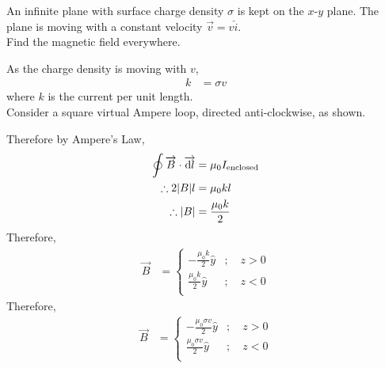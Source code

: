 \documentclass[fleqn, a4paper, 12pt, twoside]{article}
\theoremstyle{definition}
\theoremstyle{theorem}
\begin{document}
\begin{question}
	An infinite plane with surface charge density $\sigma$ is kept on the $x$-$y$ plane.
	The plane is moving with a constant velocity $\overrightarrow{v} = v \hat{i}$.\\
	Find the magnetic field everywhere.
\end{question}

\begin{solution} 
	As the charge density is moving with $v$,
	\begin{align*}
		k & = \sigma v
	\end{align*}
	where $k$ is the current per unit length.\\
	Consider a square virtual Ampere loop, directed anti-clockwise, as shown.
	\begin{figure}[H]
	\end{figure}
	Therefore by Ampere's Law,
	\begin{align*}
		\oint \overrightarrow{B} \cdot \overrightarrow{\dif l} & = \mu_0 I_{\textnormal{enclosed}} \\
		\therefore 2 |B| l                                     & = \mu_0 k l                       \\
		\therefore |B|                                         & = \frac{\mu_0 k}{2}
	\end{align*}
	Therefore,
	\begin{align*}
		\overrightarrow{B} &=
			\begin{cases}
				-\frac{\mu_0 k}{2} \hat{y} & ;\quad z > 0 \\
				\frac{\mu_0 k}{2} \hat{y}  & ;\quad z < 0 \\
			\end{cases}
	\end{align*}
	Therefore,
	\begin{align*}
		\overrightarrow{B} &=
			\begin{cases}
				-\frac{\mu_0 \sigma v}{2} \hat{y} & ;\quad z > 0 \\
				\frac{\mu_0 \sigma v}{2} \hat{y}  & ;\quad z < 0 \\
			\end{cases}
	\end{align*}
\end{solution}
\end{document}
